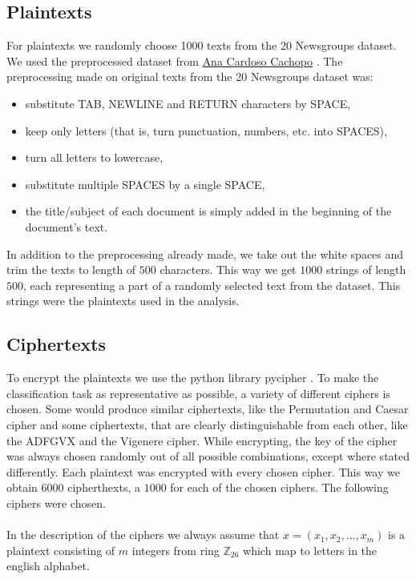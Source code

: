 \documentclass[a4paper]{article}
\begin{document}

\subsection{Plaintexts}
For plaintexts we randomly choose 1000 texts from the 20 Newsgroups dataset. We used the preprocessed dataset from \href{http://ana.cachopo.org/datasets-for-single-label-text-categorization}{Ana Cardoso Cachopo} \cite{2007:phd-Ana-Cardoso-Cachopo}. The preprocessing made on original texts from the 20 Newsgroups dataset was:

\begin{itemize}	
	\setlength\itemsep{-0.2em}
    \item substitute TAB, NEWLINE and RETURN characters by SPACE,
    \item keep only letters (that is, turn punctuation, numbers, etc. into SPACES),
    \item turn all letters to lowercase,
    \item substitute multiple SPACES by a single SPACE,
    \item the title/subject of each document is simply added in the beginning of the document's text.
\end{itemize}


In addition to the preprocessing already made, we take out the white spaces and trim the texts to length of $500$ characters. This way we get $1000$ strings of length $500$, each representing a part of a randomly selected text from the dataset. This strings were the plaintexts used in the analysis.

\subsection{Ciphertexts}
To encrypt the plaintexts we use the python library pycipher \cite{pycipher}. To make the classification task as representative as possible, a variety of different ciphers is chosen. Some would produce similar ciphertexts, like the Permutation and Caesar cipher and some ciphertexts, that are clearly distinguishable from each other, like the ADFGVX and the Vigenere cipher. While encrypting, the key of the cipher was always chosen randomly out of all possible combinations, except where stated differently. Each plaintext was encrypted with every chosen cipher. This way we obtain $6000$ cipherthexts, a $1000$ for each of the chosen ciphers. The following ciphers were chosen.\\
\\
In the description of the ciphers we always assume that $x = (x_{1}, x_{2}, ...,x_{m})$ is a plaintext consisting of $m$ integers from ring $\mathbb{Z}_{26}$ which map to letters in the english alphabet.
\end{document}
